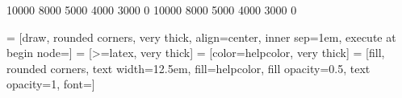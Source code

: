 \usepackage{float}
\usepackage{subcaption}
\usepackage{wrapfig}
\usepackage{mdframed}

\usepackage[toc, page]{appendix}
\usepackage{blindtext}

\usepackage{fancyhdr}

\usepackage{titlesec}
\titleformat{\chapter}[display]
{\normalfont\huge\bfseries}{\chaptertitlename~\thechapter}{20pt}{\Huge}
\titlespacing*{\chapter}{0pt}{50pt}{40pt}

\expandafter\def\expandafter\normalsize\expandafter{%
    \normalsize
    \setlength\abovedisplayskip{15pt}
    \setlength\belowdisplayskip{15pt}
    \setlength\abovedisplayshortskip{15pt}
    \setlength\belowdisplayshortskip{15pt}
}

\setlength{\intextsep}{25pt}

 10000 8000 5000 4000 3000 0 %
 10000 8000 5000 4000 3000 0 %
\raggedbottom

\usepackage{tikz}
\usetikzlibrary{arrows, positioning, fit, backgrounds, calc}

\usepackage{pgfplots}
\pgfplotsset{compat=newest}



 

 = [draw, rounded corners, very thick, align=center, inner 
sep=1em, execute at begin node=\setlength{\baselineskip}{2em}] 
 = [>=latex, very thick] 
 = [color=helpcolor, very thick] 
 = [fill, rounded corners, text width=12.5em, 
fill=helpcolor, fill opacity=0.5, text opacity=1, font=\small] 

